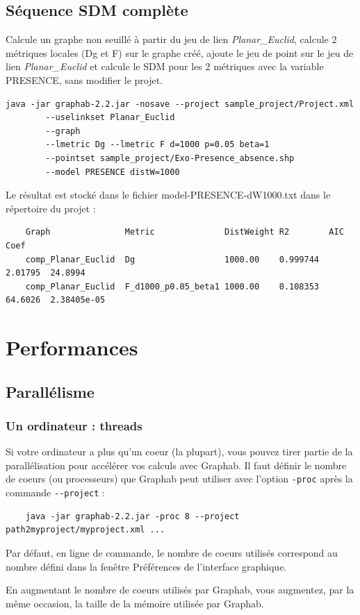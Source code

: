 \documentclass[a4paper,10pt]{report}
\begin{document}
\section{Séquence SDM complète}
Calcule un graphe non seuillé à partir du jeu de lien \textit{Planar\_Euclid}, calcule 2 métriques locales (Dg et F) sur le graphe créé, ajoute le jeu de point 
sur le jeu de lien \textit{Planar\_Euclid} et calcule le SDM pour les 2 métriques avec la variable PRESENCE, sans modifier le projet.
\begin{Verbatim}[tabsize=4]
	java -jar graphab-2.2.jar -nosave --project sample_project/Project.xml 
		--uselinkset Planar_Euclid 
		--graph 
		--lmetric Dg --lmetric F d=1000 p=0.05 beta=1 
		--pointset sample_project/Exo-Presence_absence.shp 
		--model PRESENCE distW=1000
\end{Verbatim}
Le résultat est stocké dans le fichier model-PRESENCE-dW1000.txt dans le répertoire du projet :
\begin{Verbatim}
	Graph               Metric              DistWeight R2        AIC      Coef
	comp_Planar_Euclid  Dg                  1000.00    0.999744  2.01795  24.8994
	comp_Planar_Euclid  F_d1000_p0.05_beta1 1000.00    0.108353  64.6026  2.38405e-05
\end{Verbatim}

\chapter{Performances}
\label{perf}
\section{Parallélisme}
\subsection{Un ordinateur : threads}
Si votre ordinateur a plus qu'un coeur (la plupart), vous pouvez tirer partie de la parallélisation pour accélérer vos calculs avec Graphab.
Il faut définir le nombre de coeurs (ou processeurs) que Graphab peut utiliser avec l'option \verb|-proc| après la commande \verb|--project| :
\begin{Verbatim}
	java -jar graphab-2.2.jar -proc 8 --project path2myproject/myproject.xml ...
\end{Verbatim}
Par défaut, en ligne de commande, le nombre de coeurs utilisés correspond au nombre défini dans la fenêtre Préférences de l'interface graphique.

En augmentant le nombre de coeurs utilisés par Graphab, vous augmentez, par la même occasion, la taille de la mémoire utilisée par Graphab.
\end{document}
